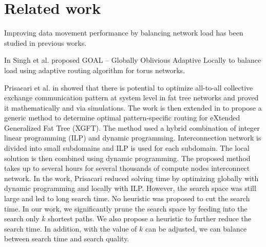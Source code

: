 \section{Related work}
\label{sec:relatedwork}

Improving data movement performance by balancing network load has been studied in previous works. 

In \cite{singh2003:GOAL} Singh et al. proposed GOAL -- Globally Oblivious Adaptive Locally to balance load using adaptive routing algorithm for torus networks.



Prisacari et al. in \cite{Prisacari13a} showed that there is potential to optimize all-to-all collective exchange communication pattern at system level in fat tree networks and proved it mathematically and via simulations. The work is then extended in \cite{Prisacari13b} to propose a generic method to determine optimal pattern-specific routing for eXtended Generalized Fat Tree (XGFT). The method used a hybrid combination of integer linear programming (ILP) and dynamic programming. Interconnection network is divided into small subdomains and ILP is used for each subdomain. The local solution is then combined using dynamic programming. The proposed method takes up to several hours for several thousands of compute nodes interconnect network. In the work, Prisacari reduced solving time by optimizing globally with dynamic programming and locally with ILP. However, the search space was still large and led to long search time. No heuristic was proposed to cut the search time. In our work, we significantly prune the search space by feeding into the search only $k$ shortest paths. We also propose a heuristic to further reduce the search time. In addition, with the value of $k$ can be adjusted, we can balance between search time and search quality. 

